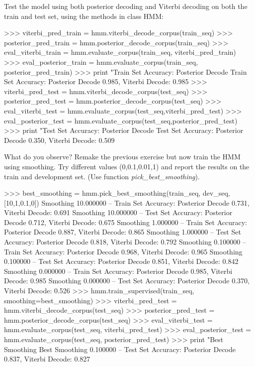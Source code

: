 \begin{exercise}
Test the model using both posterior decoding and Viterbi decoding on
both the train and test set, using the methods in class HMM:
\begin{python}
>>> viterbi_pred_train = hmm.viterbi_decode_corpus(train_seq)
>>> posterior_pred_train = hmm.posterior_decode_corpus(train_seq)
>>> eval_viterbi_train =   hmm.evaluate_corpus(train_seq, viterbi_pred_train)
>>> eval_posterior_train =  hmm.evaluate_corpus(train_seq, posterior_pred_train)
>>> print "Train Set Accuracy: Posterior Decode %
Train Set Accuracy: Posterior Decode 0.985, Viterbi Decode: 0.985
>>> viterbi_pred_test = hmm.viterbi_decode_corpus(test_seq)
>>> posterior_pred_test = hmm.posterior_decode_corpus(test_seq)
>>> eval_viterbi_test =   hmm.evaluate_corpus(test_seq,viterbi_pred_test)
>>> eval_posterior_test = hmm.evaluate_corpus(test_seq,posterior_pred_test)
>>> print "Test Set Accuracy: Posterior Decode %
Test Set Accuracy: Posterior Decode 0.350, Viterbi Decode: 0.509
\end{python}
What do you observe? Remake the previous exercise but now train the HMM
using smoothing. Try different values (0,0.1,0.01,1) and report the results on the
train and development set. (Use function
\emph{pick\_best\_smoothing}).


\begin{python}
>>> best_smoothing = hmm.pick_best_smoothing(train_seq, dev_seq, [10,1,0.1,0])
Smoothing 10.000000 --  Train Set Accuracy: Posterior Decode 0.731, Viterbi Decode: 0.691
Smoothing 10.000000 -- Test Set Accuracy: Posterior Decode 0.712, Viterbi Decode: 0.675
Smoothing 1.000000 --  Train Set Accuracy: Posterior Decode 0.887, Viterbi Decode: 0.865
Smoothing 1.000000 -- Test Set Accuracy: Posterior Decode 0.818, Viterbi Decode: 0.792
Smoothing 0.100000 --  Train Set Accuracy: Posterior Decode 0.968, Viterbi Decode: 0.965
Smoothing 0.100000 -- Test Set Accuracy: Posterior Decode 0.851, Viterbi Decode: 0.842
Smoothing 0.000000 --  Train Set Accuracy: Posterior Decode 0.985, Viterbi Decode: 0.985
Smoothing 0.000000 -- Test Set Accuracy: Posterior Decode 0.370, Viterbi Decode: 0.526
>>> hmm.train_supervised(train_seq, smoothing=best_smoothing)
>>> viterbi_pred_test = hmm.viterbi_decode_corpus(test_seq)
>>> posterior_pred_test = hmm.posterior_decode_corpus(test_seq)
>>> eval_viterbi_test =   hmm.evaluate_corpus(test_seq, viterbi_pred_test)
>>> eval_posterior_test = hmm.evaluate_corpus(test_seq, posterior_pred_test)
>>> print "Best Smoothing %
Best Smoothing 0.100000 --  Test Set Accuracy: Posterior Decode 0.837, Viterbi Decode: 0.827
\end{python}



\end{exercise}
